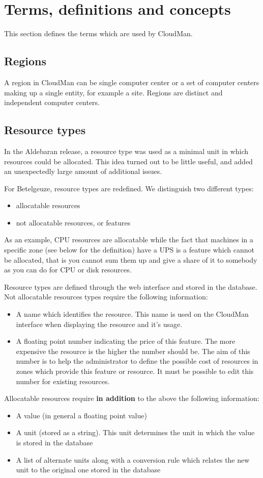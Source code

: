 \section{Terms, definitions and concepts}
This section defines the terms which are used by CloudMan. 

\subsection{Regions}
A region in CloudMan can be single computer center or a set of computer centers making up a single entity, for example a site. Regions are distinct and independent computer centers. 

\subsection{Resource types}
In the Aldebaran release, a resource type was used as a minimal unit in which resources could be allocated. This idea turned out to be little useful, and added an unexpectedly large amount of additional issues. 

For Betelgeuze, resource types are redefined. We distinguish two different types:
\begin{itemize}
\item allocatable resources
\item not allocatable resources, or features
\end{itemize}
As an example, CPU resources are allocatable while the fact that machines in a specific zone (see below for the definition) have a UPS is a feature which cannot be allocated, that is you cannot sum them up and give a share of it to somebody as you can do for CPU or disk resources. 

Resource types are defined through the web interface and stored in the database. Not allocatable resources types require the following information:
\begin{itemize}
\item A name which identifies the resource. This name is used on the CloudMan interface when displaying the resource and it's usage. 
\item A floating point number indicating the price of this feature. The more expensive the resource is the higher the number should be. The aim of this number is to help the administrator to define the possible cost of resources in zones which provide this feature or resource. It must be possible to edit this number for existing resources. 
\end{itemize}
Allocatable resources require {\bf in addition} to the above the following information:
\begin{itemize}
\item A value (in general a floating point value)
\item A unit (stored as a string). This unit determines the unit in which the value is stored in the database
\item A list of alternate units along with a conversion rule which relates the new unit to the original one stored in the database 
\end{itemize}

